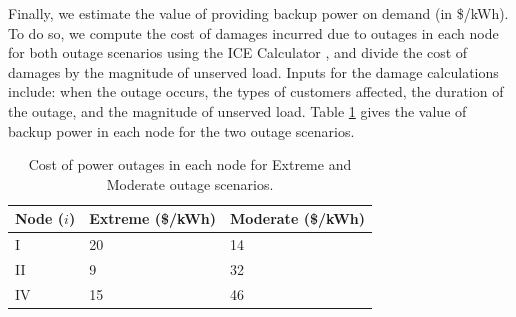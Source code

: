 \documentclass[journal]{IEEEtran}
\begin{document}
Finally, we estimate the value of providing backup power on demand (in \$/kWh). To do so, we compute the cost of damages incurred due to outages in each node for both outage scenarios using the ICE Calculator \cite{ice_calculator_2015}, and divide the cost of damages by the magnitude of unserved load. Inputs for the damage calculations include: when the outage occurs, the types of customers affected, the duration of the outage, and the magnitude of unserved load. Table \ref{tab:outage_costs} gives the value of backup power in each node for the two outage scenarios.

\begin{table}[!htbp]
    \renewcommand{\arraystretch}{1}
    \caption{Cost of power outages in each node for Extreme and Moderate outage scenarios.}
    \label{tab:outage_costs}
    \centering
    \def\colmargin{6.75cm}
    \begin{tabular}{lll}
    \hline
    \textbf{Node ($i$)} & \textbf{Extreme} (\$/kWh) & \textbf{Moderate} (\$/kWh) \\
    \hline
    I & 20 & 14 \\
    II & 9  & 32 \\
    IV & 15 & 46 \\
    \hline
    \end{tabular}
\end{table}
\end{document}
